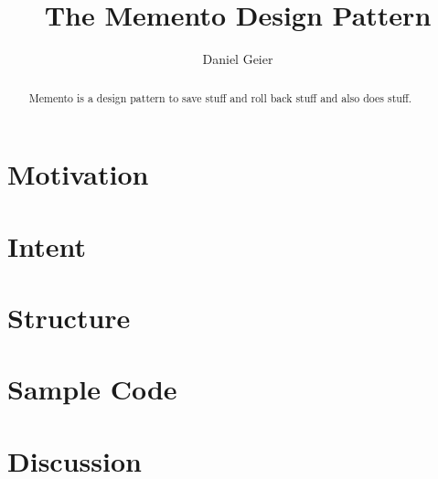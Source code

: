 \documentclass[11pt, a4paper, twoside]{article}
\title{The Memento Design Pattern}
\author{Daniel Geier}
\date{} %
\theoremstyle{plain}\newtheorem{Lemma}{Lemma}
\theoremstyle{plain}\newtheorem{Satz}[Lemma]{Satz}
\theoremstyle{definition}\newtheorem{Definition}[Lemma]{Definition}
\theoremstyle{definition}\newtheorem*{Beispiel}{Beispiel}
\theoremstyle{remark}\newtheorem*{Bemerkung}{Bemerkung}
\begin{document}
	\maketitle

	\begin{abstract} 
		Memento is a design pattern to save stuff and roll back stuff and also does stuff.
	\end{abstract}


	\section{Motivation}
	\label{motivation}
	
	 
	 \section{Intent}
	
	\section{Structure}
	
	\section{Sample Code}
	
	\section{Discussion}
	
	
	
\end{document}
